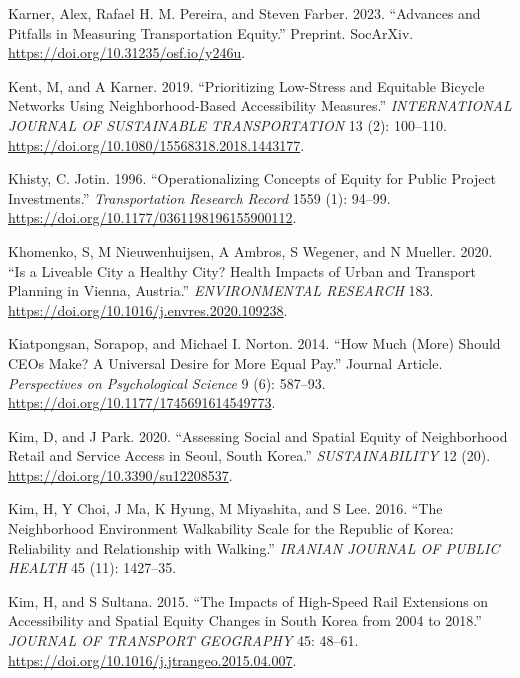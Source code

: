 \documentclass[12pt, oneside]{report}
\newlength{\cslhangindent}
\newlength{\cslentryspacingunit} %
\newenvironment{CSLReferences}[2] %
 {%
  \setlength{\parindent}{0pt}
  \ifodd #1
  \let\oldpar\par
  \def\par{\hangindent=\cslhangindent\oldpar}
  \fi
  \setlength{\parskip}{#2\cslentryspacingunit}
 }%
 {}
\begin{document}
\begin{CSLReferences}{1}{0}
\leavevmode{}%
Karner, Alex, Rafael H. M. Pereira, and Steven Farber. 2023. {``Advances
and Pitfalls in Measuring Transportation Equity.''} Preprint.
{SocArXiv}. \url{https://doi.org/10.31235/osf.io/y246u}.

\leavevmode{}%
Kent, M, and A Karner. 2019. {``Prioritizing Low-Stress and Equitable
Bicycle Networks Using Neighborhood-Based Accessibility Measures.''}
\emph{INTERNATIONAL JOURNAL OF SUSTAINABLE TRANSPORTATION} 13 (2):
100--110. \url{https://doi.org/10.1080/15568318.2018.1443177}.

\leavevmode{}%
Khisty, C. Jotin. 1996. {``Operationalizing {Concepts} of {Equity} for
{Public Project Investments}.''} \emph{Transportation Research Record}
1559 (1): 94--99. \url{https://doi.org/10.1177/0361198196155900112}.

\leavevmode{}%
Khomenko, S, M Nieuwenhuijsen, A Ambros, S Wegener, and N Mueller. 2020.
{``Is a Liveable City a Healthy City? {Health} Impacts of Urban and
Transport Planning in {Vienna}, {Austria}.''} \emph{ENVIRONMENTAL
RESEARCH} 183. \url{https://doi.org/10.1016/j.envres.2020.109238}.

\leavevmode{}%
Kiatpongsan, Sorapop, and Michael I. Norton. 2014. {``How Much (More)
Should CEOs Make? A Universal Desire for More Equal Pay.''} Journal
Article. \emph{Perspectives on Psychological Science} 9 (6): 587--93.
\url{https://doi.org/10.1177/1745691614549773}.

\leavevmode{}%
Kim, D, and J Park. 2020. {``Assessing {Social} and {Spatial Equity} of
{Neighborhood Retail} and {Service Access} in {Seoul}, {South Korea}.''}
\emph{SUSTAINABILITY} 12 (20). \url{https://doi.org/10.3390/su12208537}.

\leavevmode{}%
Kim, H, Y Choi, J Ma, K Hyung, M Miyashita, and S Lee. 2016. {``The
{Neighborhood Environment Walkability Scale} for the {Republic} of
{Korea}: {Reliability} and {Relationship} with {Walking}.''}
\emph{IRANIAN JOURNAL OF PUBLIC HEALTH} 45 (11): 1427--35.

\leavevmode{}%
Kim, H, and S Sultana. 2015. {``The Impacts of High-Speed Rail
Extensions on Accessibility and Spatial Equity Changes in South Korea
from 2004 to 2018.''} \emph{{JOURNAL} {OF} {TRANSPORT} {GEOGRAPHY}} 45:
48--61. \url{https://doi.org/10.1016/j.jtrangeo.2015.04.007}.


\end{CSLReferences}
\end{document}
